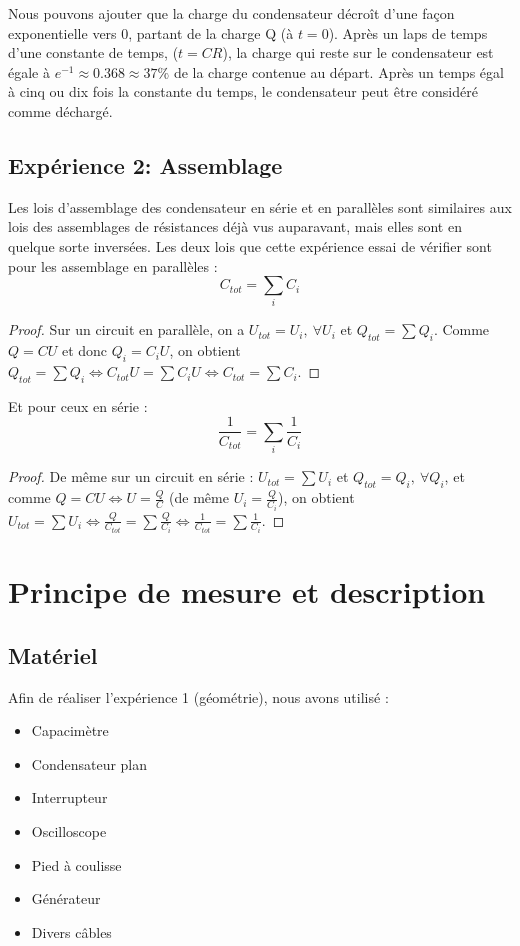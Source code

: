 \documentclass[11pt]{article}
\begin{document}
Nous pouvons ajouter que la charge du condensateur décroît d'une façon exponentielle vers 0, partant de la charge Q (à $t=0$).  Après un laps de temps d'une constante de temps, ($t=CR$), la charge qui reste sur le condensateur est égale à $e^{-1} \approx 0.368 \approx 37\%$ de la charge contenue au départ. Après un temps égal à cinq ou dix fois la constante du temps, le condensateur peut être considéré comme déchargé.
\subsection{Expérience 2: Assemblage}
Les lois d'assemblage des condensateur en série et en parallèles sont similaires aux lois des assemblages de résistances déjà vus auparavant, mais elles sont en quelque sorte inversées. Les deux lois que cette expérience essai de vérifier sont pour les assemblage en parallèles : 
$$C_{tot}= \sum_i C_i$$

\begin{proof}
Sur un circuit en parallèle, on a $U_{tot} = U_i, \ \forall U_i$ et $Q_{tot} = \sum Q_i$. Comme $Q = CU$ et donc $Q_i = C_i U$, on obtient $Q_{tot} = \sum Q_i \Leftrightarrow C_{tot} U = \sum C_i U \Leftrightarrow C_{tot}= \sum C_i$.
\end{proof}

Et pour ceux en série : 
$$\frac{1}{C_{tot}}= \sum_i \frac{1}{C_i}$$

\begin{proof}
De même sur un circuit en série : $U_{tot} = \sum U_i$ et $Q_{tot} = Q_i, \ \forall Q_i$, et comme $Q = CU \Leftrightarrow U = \frac{Q}{C}$ (de même $U_i = \frac{Q}{C_i}$), on obtient $U_{tot} = \sum U_i \Leftrightarrow \frac{Q}{C_{tot}} = \sum \frac{Q}{C_i} \Leftrightarrow \frac{1}{C_{tot}}= \sum \frac{1}{C_i}$.
\end{proof}

\section{Principe de mesure et description}
\subsection{Matériel}

Afin de réaliser l'expérience 1 (géométrie), nous avons utilisé :
\begin{itemize}
\item Capacimètre
\item Condensateur plan
\item Interrupteur
\item Oscilloscope
\item Pied à coulisse
\item Générateur 
\item Divers câbles \\
\end{itemize}
\end{document}
